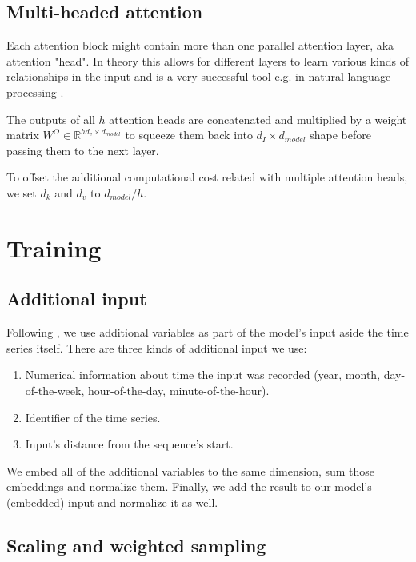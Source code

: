 \documentclass[en]{pracamgr}
\begin{document}
	\subsection{Multi-headed attention}
	
	Each attention block might contain more than one parallel attention layer, aka attention "head". In theory this allows for different layers to learn various kinds of relationships in the input and is a very successful tool e.g. in natural language processing \cite{tr}.
	
	The outputs of all $h$ attention heads are concatenated and multiplied by a weight matrix $W^O \in \mathbb{R}^{hd_{v} \times d_{model}}$ to squeeze them back into $d_I \times d_{model}$ shape before passing them to the next layer.
	
	To offset the additional computational cost related with multiple attention heads, we set $d_k$ and $d_v$ to $d_{model} / h$.
	
	\section{Training}
	
	\subsection{Additional input}
	
	Following \cite{enhancing}, we use additional variables as part of the model's input aside the time series itself.
	There are three kinds of additional input we use:
	\begin{enumerate}
		\item Numerical information about time the input was recorded (year, month, day-of-the-week, hour-of-the-day, minute-of-the-hour). 
		
		\item Identifier of the time series.
		
		\item Input's distance from the sequence's start. 
		
	\end{enumerate}
	We embed all of the additional variables to the same dimension, sum those embeddings and normalize them. Finally, we add the result to our model's (embedded) input and normalize it as well.
	
	
	\subsection{Scaling and weighted sampling}\label{s:scale}
	
\end{document}
